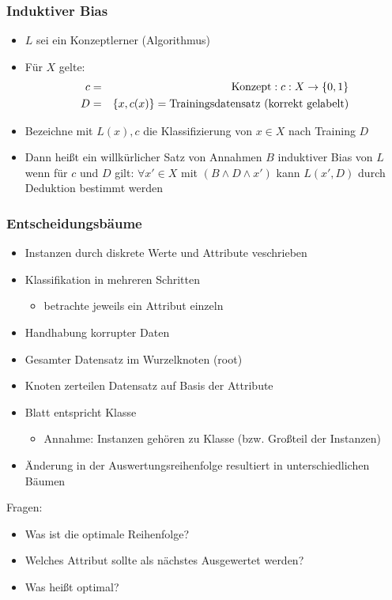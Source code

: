 	\subsubsection{Induktiver Bias}
	\begin{itemize}
		\item $L$ sei ein Konzeptlerner (Algorithmus)
		\item Für $X$ gelte:
		\begin{eqnarray*}
			c &=& \text{Konzept}: c:X\rightarrow \{0,1\}\\
			D &=& \{x, c(x)\} = \text{Trainingsdatensatz (korrekt gelabelt)}
		\end{eqnarray*}
	\item Bezeichne mit $L(x),c$ die Klassifizierung von $x\in X$ nach Training $D$
	\item Dann heißt ein willkürlicher Satz von Annahmen $B$ induktiver Bias von $L$ wenn für $c$ und $D$ gilt: $\forall x'\in X$ mit $(B\land D\land x')$ kann $L(x',D)$ durch Deduktion bestimmt werden
	\end{itemize}
	\subsubsection{Entscheidungsbäume}
	\begin{itemize}
		\item Instanzen durch diskrete Werte und Attribute veschrieben
		\item Klassifikation in mehreren Schritten
		\begin{itemize}
			\item betrachte jeweils ein Attribut einzeln
		\end{itemize}
	\item Handhabung korrupter Daten
	\item Gesamter Datensatz im Wurzelknoten (root)
	\item Knoten zerteilen Datensatz auf Basis der Attribute
	\item Blatt entspricht Klasse
	\begin{itemize}
		\item Annahme: Instanzen gehören zu Klasse (bzw. Großteil der Instanzen)
	\end{itemize}
	\item Änderung in der Auswertungsreihenfolge resultiert in unterschiedlichen Bäumen
	\end{itemize}
	Fragen:
	\begin{itemize}
		\item Was ist die optimale Reihenfolge?
		\item Welches Attribut sollte als nächstes Ausgewertet werden?
		\item Was heißt optimal?
	\end{itemize}
